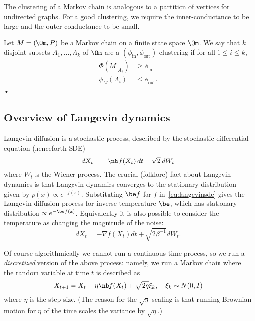The clustering of a Markov chain is analogous to a partition of vertices for undirected graphs. For a good clustering, we require the inner-conductance to be large and the outer-conductance to be small.

\begin{df}\label{df:in-out}
Let $M=(\Om,P)$ be a Markov chain on a finite state space $\Om$. 
We say that $k$ disjoint subsets $A_1,\ldots, A_k$ of $\Om$ are a $(\phi_{\text{in}}, \phi_{\text{out}})$-clustering if for all $1\le i\le k$,
\begin{align}
\Phi(M|_{A_i}) &\ge \phi_{\text{in}}\\
\phi_M(A_i)&\le \phi_{\text{out}}.
\end{align}•
\end{df}



\subsection{Overview of Langevin dynamics} 

\label{sec:overview-l}

Langevin diffusion is a stochastic process, described by the stochastic differential equation (henceforth SDE)
\begin{equation}
dX_t = -\nb f (X_t) \,dt + \sqrt{2}\,dW_t \label{eq:langevinsde}
\end{equation}
where $W_t$ is the Wiener process. %
The crucial (folklore) fact about Langevin dynamics is that Langevin dynamics converges to the stationary distribution given by $p(x) \propto e^{-f(x)}$.  
Substituting $\be f$ for $f$ in~\eqref{eq:langevinsde} gives the Langevin diffusion process for inverse temperature $\be$, which has stationary distribution $\propto e^{-\be f(x)}$. Equivalently it is also possible to consider the temperature as changing the magnitude of the noise:
$$
dX_t = -\nabla f(X_t)dt + \sqrt{2\beta^{-1}}dW_t.
$$

Of course algorithmically we cannot run a continuous-time process, so we run a \emph{discretized} version of the above process: namely, we run a Markov chain where the random variable at time $t$ is described as 
\begin{equation} 
X_{t+1} = X_t - \eta \nb f(X_t)  + \sqrt{2 \eta }\xi_k, \quad \xi_k \sim N(0,I) \label{eq:langevind} 
\end{equation}
where $\eta$ is the step size. (The reason for the $\sqrt \eta$ scaling is that running Brownian motion for $\eta$ of the time scales the variance by $\sqrt{\eta}$.)

